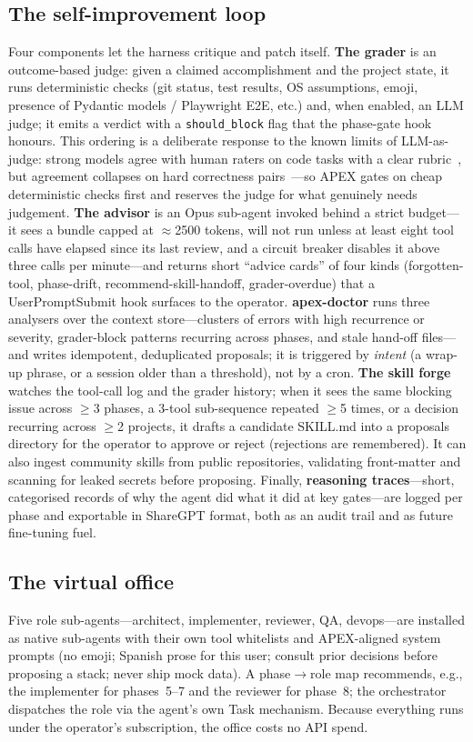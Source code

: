 \documentclass[sigconf,review,anonymous=false]{acmart}
\begin{document}
\subsection{The self-improvement loop}
\label{sec:loop}
Four components let the harness critique and patch itself.
\textbf{The grader} is an outcome-based judge: given a claimed accomplishment and
the project state, it runs deterministic checks (git status, test results, OS
assumptions, emoji, presence of Pydantic models / Playwright E2E, etc.) and, when
enabled, an LLM judge; it emits a verdict with a \texttt{should\_block} flag that
the phase-gate hook honours. This ordering is a deliberate response to the known
limits of LLM-as-judge: strong models agree with human raters on code tasks with a
clear rubric~\cite{zheng2023judging,wang2025llmjudgese}, but agreement collapses on
hard correctness pairs~\cite{tan2024judgebench}---so APEX gates on cheap
deterministic checks first and reserves the judge for what genuinely needs judgement.
\textbf{The advisor} is an Opus sub-agent invoked behind a strict budget---it sees a
bundle capped at \(\approx\)2500 tokens, will not run unless at least eight tool
calls have elapsed since its last review, and a circuit breaker disables it above
three calls per minute---and returns short ``advice cards'' of four kinds
(forgotten-tool, phase-drift, recommend-skill-handoff, grader-overdue) that a
\textsf{UserPromptSubmit} hook surfaces to the operator.
\textbf{apex-doctor} runs three analysers over the context store---clusters of
errors with high recurrence or severity, grader-block patterns recurring across
phases, and stale hand-off files---and writes idempotent, deduplicated proposals;
it is triggered by \emph{intent} (a wrap-up phrase, or a session older than a
threshold), not by a cron.
\textbf{The skill forge} watches the tool-call log and the grader history; when it
sees the same blocking issue across \(\geq\)3 phases, a 3-tool sub-sequence
repeated \(\geq\)5 times, or a decision recurring across \(\geq\)2 projects, it
drafts a candidate \textsf{SKILL.md} into a proposals directory for the operator to
approve or reject (rejections are remembered). It can also ingest community skills
from public repositories, validating front-matter and scanning for leaked secrets
before proposing.
Finally, \textbf{reasoning traces}---short, categorised records of why the agent
did what it did at key gates---are logged per phase and exportable in ShareGPT
format, both as an audit trail and as future fine-tuning fuel.

\subsection{The virtual office}
Five role sub-agents---architect, implementer, reviewer, QA, devops---are installed
as native sub-agents with their own tool whitelists and APEX-aligned system prompts
(no emoji; Spanish prose for this user; consult prior decisions before proposing a
stack; never ship mock data). A phase\(\to\)role map recommends, e.g., the
implementer for phases~5--7 and the reviewer for phase~8; the orchestrator
dispatches the role via the agent's own \textsf{Task} mechanism. Because everything
runs under the operator's subscription, the office costs no API spend.
\end{document}
